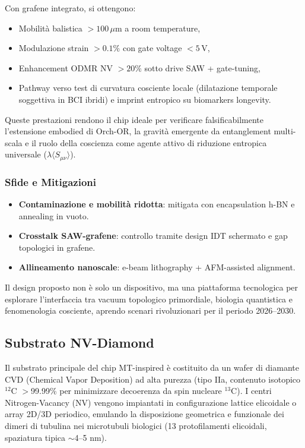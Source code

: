 \documentclass[12pt,a4paper]{article}
\begin{document}
Con grafene integrato, si ottengono:
\begin{itemize}
    \item Mobilità balistica $>100\,\mu$m a room temperature,
    \item Modulazione strain $>0.1\%$ con gate voltage $<5\,\mathrm{V}$,
    \item Enhancement ODMR NV $>20\%$ sotto drive SAW + gate-tuning,
    \item Pathway verso test di curvatura cosciente locale (dilatazione temporale soggettiva in BCI ibridi) e imprint entropico su biomarkers longevity.
\end{itemize}

Queste prestazioni rendono il chip ideale per verificare falsificabilmente l'estensione embodied di Orch-OR, la gravità emergente da entanglement multi-scala e il ruolo della coscienza come agente attivo di riduzione entropica universale ($\lambda \langle S_{\mu\nu} \rangle$).

\subsubsection{Sfide e Mitigazioni}

\begin{itemize}
    \item \textbf{Contaminazione e mobilità ridotta}: mitigata con encapsulation h-BN e annealing in vuoto.
    \item \textbf{Crosstalk SAW-grafene}: controllo tramite design IDT schermato e gap topologici in grafene.
    \item \textbf{Allineamento nanoscale}: e-beam lithography + AFM-assisted alignment.
\end{itemize}

Il design proposto non è solo un dispositivo, ma una piattaforma tecnologica per esplorare l'interfaccia tra vacuum topologico primordiale, biologia quantistica e fenomenologia cosciente, aprendo scenari rivoluzionari per il periodo 2026--2030.





\subsection{Substrato NV-Diamond}

Il substrato principale del chip MT-inspired è costituito da un wafer di diamante CVD (Chemical Vapor Deposition) ad alta purezza (tipo IIa, contenuto isotopico $^{12}$C $>$99.99\% per minimizzare decoerenza da spin nucleare $^{13}$C). I centri Nitrogen-Vacancy (NV) vengono impiantati in configurazione lattice elicoidale o array 2D/3D periodico, emulando la disposizione geometrica e funzionale dei dimeri di tubulina nei microtubuli biologici (13 protofilamenti elicoidali, spaziatura tipica $\sim$4--5 nm).
\end{document}
